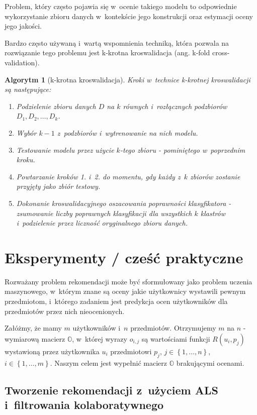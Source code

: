 \documentclass[12pt,a4paper]{report}
\newtheorem{algorytm}[df]{Algorytm}
\newcommand{\set}[1]{\left\lbrace {#1} \right\rbrace}
\begin{document}
Problem, który często pojawia się w~ocenie takiego modelu to odpowiednie wykorzystanie zbioru danych w~kontekście jego konstrukcji oraz estymacji oceny jego jakości.

Bardzo często używaną i~wartą wspomnienia techniką, która pozwala na rozwiązanie tego problemu jest k-krotna kroswalidacja (ang. k-fold cross-validation).

\begin{algorytm}[k-krotna kroswalidacja{\citep[Sec 4.8.4]{edmia}}]
Kroki w~technice k-krotnej kroswalidacji są następujące:
\begin{enumerate}
\item Podzielenie zbioru danych $\mathit{D}$ na $k$ równych i~rozłącznych podzbiorów $\mathit{D}_1, \mathit{D}_2, \ldots, \mathit{D}_k$.
\item Wybór $k-1$ z~podzbiorów i~wytrenowanie na nich modelu.
\item Testowanie modelu przez użycie $k$-tego zbioru - pominiętego w~poprzednim kroku.
\item Powtarzanie kroków 1. i~2. do momentu, gdy każdy z~$k$ zbiorów zostanie przyjęty jako zbiór testowy.
\item Dokonanie kroswalidacyjnego oszacowania poprawności klasyfikatora - zsumowanie liczby poprawnych klasyfikacji dla wszystkich $k$ klastrów i~podzielenie przez liczność oryginalnego zbioru danych. 

\end{enumerate}

\end{algorytm}

\chapter{Eksperymenty / cześć praktyczne}

Rozważany problem rekomendacji może być sformułowany jako problem uczenia maszynowego, w~którym znane są oceny jakie użytkownicy wystawili pewnym przedmiotom, i~którego zadaniem jest predykcja ocen użytkowników dla przedmiotów przez nich nieocenionych. 

Załóżmy, że mamy $m$ użytkowników i~$n$ przedmiotów. Otrzymujemy $m$ na $n$ - wymiarową macierz $\mathbb{O}$, w~której wyrazy $o_{i,j}$ są wartościami funkcji $R(u_i,p_j)$ wystawioną przez użytkownika $u_i$ przedmiotowi $p_j$, $j \in \set{1, \ldots, n}$, $i \in \set{1, \ldots, m}$. Naszym celem jest wypełnić macierz $\mathbb{O}$ brakującymi ocenami. 


\section{Tworzenie rekomendacji z~użyciem ALS i~filtrowania kolaboratywnego}
\end{document}

